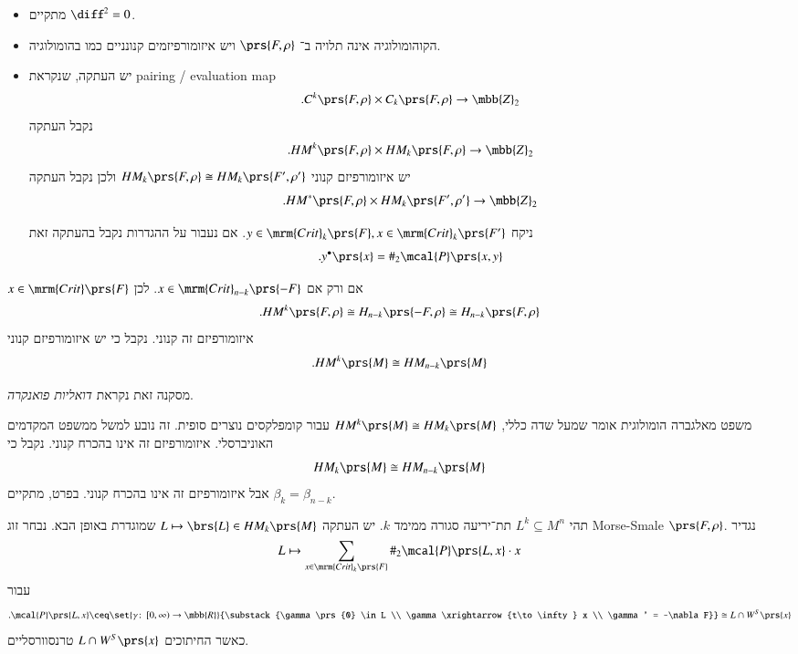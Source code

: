 \documentclass[a4paper,10pt,twoside,openany]{book}
\begin{document}
\begin{corollary}
\begin{itemize}
\item מתקיים
$\diff^2 = 0$.
\item הקוהומולוגיה אינה תלויה ב־%
$\prs{F,\rho}$
ויש איזומורפיזמים קנונניים כמו בהומולוגיה.
\item יש העתקה, שנקראת
\textenglish{pairing / evaluation map}
\[\text{.} C^k\prs{F, \rho} \times C_k\prs{F, \rho} \to \mbb{Z}_2\]
נקבל העתקה
\[\text{.} HM^k\prs{F,\rho} \times HM_k\prs{F,\rho} \to \mbb{Z}_2\]
יש איזומורפיזם קנוני
$HM_k\prs{F, \rho} \cong HM_k\prs{F', \rho'}$
ולכן נקבל העתקה
\[\text{.} HM^*\prs{F, \rho} \times HM_k\prs{F', \rho'} \to \mbb{Z}_2\]

ניקח
$y \in \mrm{Crit}_k\prs{F}, x \in \mrm{Crit}_k\prs{F'}$.
אם נעבור על ההגדרות נקבל בהעתקה זאת
\[\text{.} y^\bullet\prs{x} = \#_2 \mcal{P}\prs{x,y}\]
\end{itemize}
\end{corollary}

\begin{corollary}
$x \in \mrm{Crit}\prs{F}$
אם ורק אם
$x \in \mrm{Crit}_{n-k}\prs{-F}$.
לכן
\[\text{.} HM^k\prs{F, \rho} \cong H_{n-k}\prs{-F, \rho} \cong H_{n-k}\prs{F,\rho}\]
איזומורפיזם זה קנוני.
נקבל כי יש איזומורפיזם קנוני
\[\text{.} HM^k\prs{M} \cong HM_{n-k}\prs{M}\]

מסקנה זאת נקראת
\emph{דואליות פואנקרה}.
\end{corollary}

\begin{remark}
משפט מאלגברה הומולוגית אומר שמעל שדה כללי,
$HM^k\prs{M} \cong HM_k\prs{M}$
עבור קומפלקסים נוצרים סופית.
זה נובע למשל ממשפט המקדמים האוניברסלי.
איזומורפיזם זה אינו בהכרח קנוני.
נקבל כי
\[HM_k\prs{M} \cong HM_{n-k}\prs{M}\]
אבל איזומורפיזם זה אינו בהכרח קנוני.
בפרט, מתקיים
$\beta_k = \beta_{n-k}$.
\end{remark}

תהי
$L^k \subseteq M^n$
תת־יריעה סגורה ממימד
$k$.
יש העתקה
$L \mapsto \brs{L} \in HM_k\prs{M}$
שמוגדרת באופן הבא.
נבחר זוג
\textenglish{Morse-Smale}
$\prs{F,\rho}$.
נגדיר
\[L \mapsto \sum_{x \in \mrm{Crit}_k\prs{F}} \#_2 \mcal{P}\prs{L, x} \cdot x\]
עבור
\[\text{.} \mcal{P}\prs{L,x} \ceq \set{\gamma \colon \left[0,\infty\right) \to \mbb{R}}{\substack{\gamma\prs{0} \in L \\ \gamma \xrightarrow{t\to\infty} x \\ \gamma' = -\nabla F}} \cong L \cap W^S\prs{x}\]
כאשר החיתוכים
$L \cap W^S\prs{x}$
טרנסוורסליים.
\end{document}

